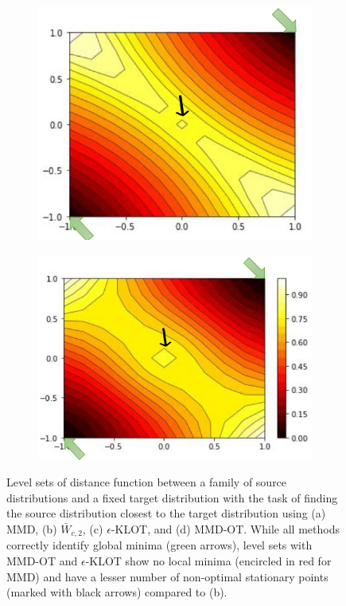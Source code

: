 \begin{figure}[t]
\begin{subfigure}{.22\textwidth}
\end{subfigure}
\begin{subfigure}{.22\textwidth}
    \centering
    \includegraphics[width=\linewidth]{chapter-1/images/LS3.pdf}  
    \caption{}
\end{subfigure}
\begin{subfigure}{.22\textwidth}
    \centering
    \includegraphics[scale=0.39]{chapter-1/images/LS4.pdf}  
    \caption{}
\end{subfigure}
    \caption[Qualitative comparison of the level sets of distance function between a family of source distributions and a fixed target distribution of the proposed MMD-OT and related divergences.]{Level sets of distance function between a family of source distributions and a fixed target distribution with the task of finding the source distribution closest to the target distribution using (a) MMD, (b) $\bar{W}_{c, 2}$, (c) $\epsilon$-KLOT, and (d) MMD-OT. 
    While all methods correctly identify global minima (green arrows), level sets with MMD-OT and $\epsilon$-KLOT show no local minima (encircled in red for MMD) and have a lesser number of non-optimal stationary points (marked with black arrows) compared to (b). 
    }
    \label{fig:contours}
\end{figure}

